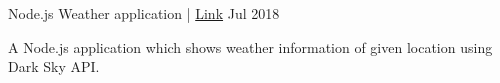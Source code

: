\begin{cventries}
    \cventry
    {\textnormal{Node.js}} %
    {Weather application | \href{https://github.com/Rpmalukani22/weather-app}{ Link}} %
    { } %
    {Jul 2018} %
    {
      \begin{cvitems} %
        \item {
      A Node.js application which shows weather information of given location using Dark Sky API.
 }
      \end{cvitems}
  } 
\end{cventries}
